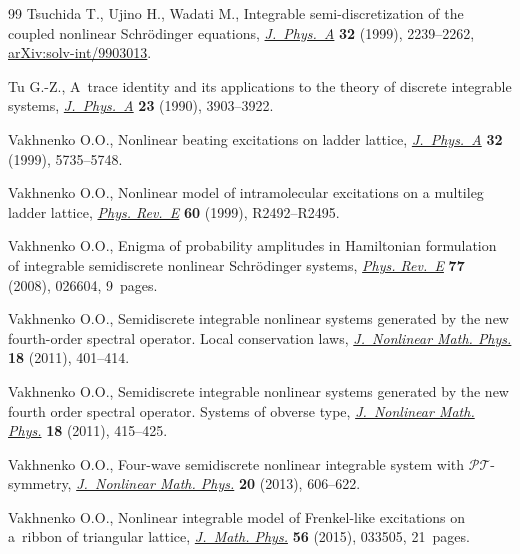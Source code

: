 \documentclass[pdftex]{sigma}
\numberwithin{equation}{section}
\begin{document}
\begin{thebibliography}{99}
Tsuchida T., Ujino H., Wadati M., Integrable semi-discretization of the coupled
 nonlinear {S}chr\"odinger equations,
 \href{https://doi.org/10.1088/0305-4470/32/11/016}{\textit{J.~Phys.~A}}
 \textbf{32} (1999), 2239--2262,
 \href{http://arxiv.org/abs/solv-int/9903013}{arXiv:solv-int/9903013}.

Tu G.-Z., A~trace identity and its applications to the theory of discrete
 integrable systems,
 \href{https://doi.org/10.1088/0305-4470/23/17/020}{\textit{J.~Phys.~A}}
 \textbf{23} (1990), 3903--3922.

Vakhnenko O.O., Nonlinear beating excitations on ladder lattice,
 \href{https://doi.org/10.1088/0305-4470/32/30/315}{\textit{J.~Phys.~A}}
 \textbf{32} (1999), 5735--5748.

Vakhnenko O.O., Nonlinear model of intramolecular excitations on a multileg
 ladder lattice,
 \href{https://doi.org/10.1103/PhysRevE.60.R2492}{\textit{Phys. Rev.~E}}
 \textbf{60} (1999), R2492--R2495.

Vakhnenko O.O., Enigma of probability amplitudes in {H}amiltonian formulation
 of integrable semidiscrete nonlinear {S}chr\"odinger systems,
 \href{https://doi.org/10.1103/PhysRevE.77.026604}{\textit{Phys. Rev.~E}}
 \textbf{77} (2008), 026604, 9~pages.

Vakhnenko O.O., Semidiscrete integrable nonlinear systems generated by the new
 fourth-order spectral operator. {L}ocal conservation laws,
 \href{https://doi.org/10.1142/S1402925111001672}{\textit{J.~Nonlinear Math.
 Phys.}} \textbf{18} (2011), 401--414.

Vakhnenko O.O., Semidiscrete integrable nonlinear systems generated by the new
 fourth order spectral operator. {S}ystems of obverse type,
 \href{https://doi.org/10.1142/S1402925111001684}{\textit{J.~Nonlinear Math.
 Phys.}} \textbf{18} (2011), 415--425.

Vakhnenko O.O., Four-wave semidiscrete nonlinear integrable system with
 {$\mathcal{PT}$}-symmetry,
 \href{https://doi.org/10.1080/14029251.2013.865827}{\textit{J.~Nonlinear
 Math. Phys.}} \textbf{20} (2013), 606--622.

Vakhnenko O.O., Nonlinear integrable model of {F}renkel-like excitations on
 a~ribbon of triangular lattice,
 \href{https://doi.org/10.1063/1.4914510}{\textit{J.~Math. Phys.}} \textbf{56}
 (2015), 033505, 21~pages.


\end{thebibliography}
\end{document}
